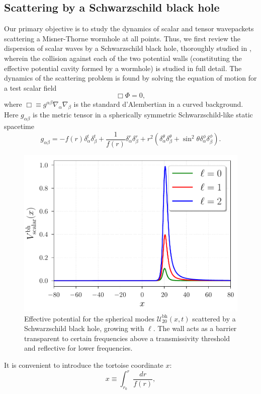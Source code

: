\documentclass[article,aps,nofootinbib,twocolumn,superscriptaddress]{revtex4-1}
\begin{document}
\subsection{Scattering by a Schwarzschild black hole}\label{subsec:bh} 
Our primary objective is to study the dynamics of scalar and tensor wavepackets scattering a Misner-Thorne wormhole at all points. Thus, we first review the dispersion of scalar waves by a Schwarzschild black hole, thoroughly studied in \citep{doi:10.1063/1.522949, Sanchez:1976xm, Sanchez:1977si, Sanchez:1977vz}, wherein the collision against each of the two potential walls (constituting the effective potential cavity formed by a wormhole) is studied in full detail. The dynamics of the scattering problem is found by solving the equation of motion for a test scalar field
\begin{equation}
\Box\Phi=0,\label{eq:scalar_eq_mov} 
\end{equation}
where $\Box\equiv g^{\alpha\beta}\nabla_{\alpha}\nabla_{\beta}$ is the standard d'Alembertian in a curved background. Here $g_{\alpha\beta}$ is the metric tensor in a spherically symmetric Schwarzschild-like static spacetime
\begin{equation}
g_{\alpha\beta}=-f(r)\delta^t_{\alpha}\delta^t_{\beta}+\frac{1}{f(r)}\delta^r_{\alpha}\delta^r_{\beta}+r^2\left(\delta^{\theta}_{\alpha}\delta^{\theta}_{\beta}+\sin^2\theta\delta^{\phi}_{\alpha}\delta^{\phi}_{\beta}\right).
\label{eq:Schwarzschild}
\end{equation}
\begin{figure}[t]
\centering
\includegraphics[width=.45\textwidth]{figures/potential_scalar_bh.pdf}
\caption{\label{fig:Potential_BH} Effective potential for the spherical modes $\mathcal{U}^{\mathrm{bh}}_{20}(x,t)$ scattered by a Schwarzschild black hole, growing with $\ell$. The wall acts as a barrier transparent to certain frequencies above a transmissivity threshold and reflective for lower frequencies.}
\end{figure}
It is convenient to introduce the tortoise coordinate $x$:
\begin{equation}
x\equiv\displaystyle{\int_{r_0}^r\frac{dr}{f(r)}},
\label{eq:tortoise}
\end{equation} 
\end{document}
